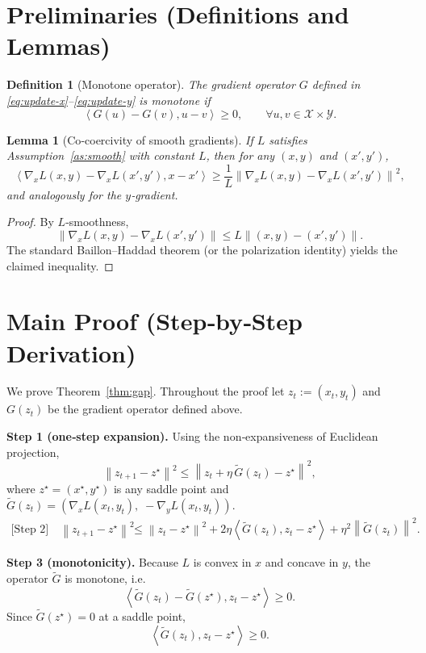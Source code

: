 \documentclass{article}
\newtheorem{lemma}{Lemma}
\newtheorem{definition}{Definition}
\newcommand{\norm}[1]{\left\|#1\right\|}
\newcommand{\inner}[2]{\left\langle #1,#2\right\rangle}
\begin{document}
\section*{Preliminaries (Definitions and Lemmas)}
\begin{definition}[Monotone operator]
The gradient operator $G$ defined in \eqref{eq:update-x}–\eqref{eq:update-y} is \emph{monotone} if
\[
\inner{G(u)-G(v)}{u-v}\ge0,\qquad\forall u,v\in\mathcal{X}\times\mathcal{Y}.
\]
\end{definition}
\begin{lemma}[Co‑coercivity of smooth gradients] \label{lem:coercive}
If $L$ satisfies Assumption~\ref{as:smooth} with constant $L$, then for any $(x,y)$ and $(x',y')$,
\[
\inner{\nabla_{x}L(x,y)-\nabla_{x}L(x',y')}{x-x'}\ge\frac{1}{L}\norm{\nabla_{x}L(x,y)-\nabla_{x}L(x',y')}^{2},
\]
and analogously for the $y$‑gradient.
\end{lemma}
\begin{proof}
By $L$‑smoothness,
\[
\norm{\nabla_{x}L(x,y)-\nabla_{x}L(x',y')}\le L\norm{(x,y)-(x',y')}.
\]
The standard Baillon–Haddad theorem (or the polarization identity) yields the claimed inequality. \hfill\qedsymbol
\end{proof}

\section*{Main Proof (Step‑by‑Step Derivation)}
We prove Theorem~\ref{thm:gap}. Throughout the proof let $z_{t}:=(x_{t},y_{t})$ and $G(z_{t})$ be the gradient operator defined above.

\noindent\textbf{Step 1 (one‑step expansion).}  
Using the non‑expansiveness of Euclidean projection,
\[
\norm{z_{t+1}-z^{\star}}^{2}
\le \norm{z_{t}+ \eta\,\tilde{G}(z_{t})-z^{\star}}^{2},
\tag{1}
\]
where $z^{\star}=(x^{\star},y^{\star})$ is any saddle point and $\tilde{G}(z_{t})=(\nabla_{x}L(x_{t},y_{t}),\;-\nabla_{y}L(x_{t},y_{t}))$.
\[
\begin{aligned}
\text{[Step 2]} \quad
\norm{z_{t+1}-z^{\star}}^{2}
&\le \norm{z_{t}-z^{\star}}^{2}
+2\eta\inner{\tilde{G}(z_{t})}{z_{t}-z^{\star}}
+\eta^{2}\norm{\tilde{G}(z_{t})}^{2}.
\end{aligned}
\tag{2}
\]

\noindent\textbf{Step 3 (monotonicity).}  
Because $L$ is convex in $x$ and concave in $y$, the operator $\tilde{G}$ is monotone, i.e.
\[
\inner{\tilde{G}(z_{t})-\tilde{G}(z^{\star})}{z_{t}-z^{\star}}\ge0.
\tag{3}
\]
Since $\tilde{G}(z^{\star})=0$ at a saddle point,
\[
\inner{\tilde{G}(z_{t})}{z_{t}-z^{\star}}\ge0.
\tag{4}
\]
\end{document}
